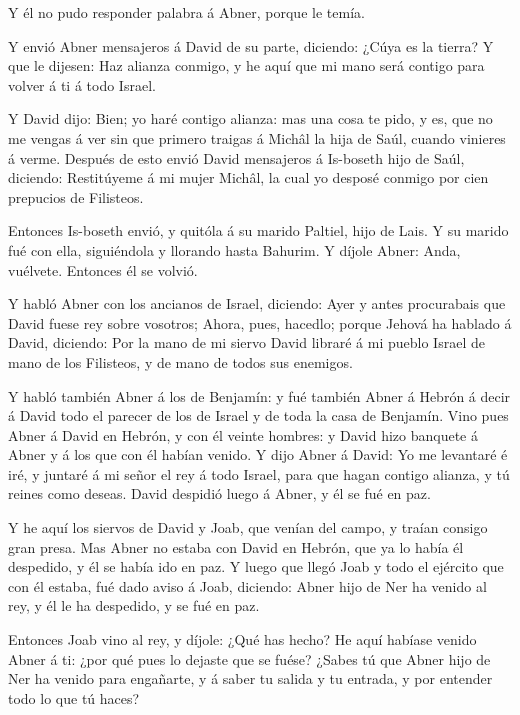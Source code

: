  Y él no pudo responder palabra á Abner, porque le temía.

 Y envió Abner mensajeros á David de su parte, diciendo:
¿Cúya es la tierra? Y que le dijesen: Haz alianza conmigo, y he aquí que
mi mano será contigo para volver á ti á todo Israel.

 Y David dijo: Bien; yo haré contigo alianza: mas una cosa
te pido, y es, que no me vengas á ver sin que primero traigas á Michâl
la hija de Saúl, cuando vinieres á verme.  Después de esto
envió David mensajeros á Is-boseth hijo de Saúl, diciendo: Restitúyeme á
mi mujer Michâl, la cual yo desposé conmigo por cien prepucios de
Filisteos.

 Entonces Is-boseth envió, y quitóla á su marido Paltiel,
hijo de Lais.  Y su marido fué con ella, siguiéndola y
llorando hasta Bahurim. Y díjole Abner: Anda, vuélvete. Entonces él se
volvió.

 Y habló Abner con los ancianos de Israel, diciendo: Ayer y
antes procurabais que David fuese rey sobre vosotros; 
Ahora, pues, hacedlo; porque Jehová ha hablado á David, diciendo: Por la
mano de mi siervo David libraré á mi pueblo Israel de mano de los
Filisteos, y de mano de todos sus enemigos.

 Y habló también Abner á los de Benjamín: y fué también
Abner á Hebrón á decir á David todo el parecer de los de Israel y de
toda la casa de Benjamín.  Vino pues Abner á David en
Hebrón, y con él veinte hombres: y David hizo banquete á Abner y á los
que con él habían venido.  Y dijo Abner á David: Yo me
levantaré é iré, y juntaré á mi señor el rey á todo Israel, para que
hagan contigo alianza, y tú reines como deseas. David despidió luego á
Abner, y él se fué en paz.

 Y he aquí los siervos de David y Joab, que venían del
campo, y traían consigo gran presa. Mas Abner no estaba con David en
Hebrón, que ya lo había él despedido, y él se había ido en paz.
 Y luego que llegó Joab y todo el ejército que con él
estaba, fué dado aviso á Joab, diciendo: Abner hijo de Ner ha venido al
rey, y él le ha despedido, y se fué en paz.

 Entonces Joab vino al rey, y díjole: ¿Qué has hecho? He
aquí habíase venido Abner á ti: ¿por qué pues lo dejaste que se fuése?
 ¿Sabes tú que Abner hijo de Ner ha venido para engañarte,
y á saber tu salida y tu entrada, y por entender todo lo que tú haces?

